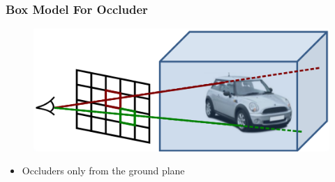 \documentclass[xcolor=dvipsnames]{beamer}
\begin{document}
\begin{frame}
	\frametitle{Box Model For Occluder}
	
	\begin{figure}
		\includegraphics[width=\textwidth]{img/occ_state.png}
	\end{figure}
	
	\begin{itemize}
		\item Occluders only from the ground plane
	\end{itemize}
	
\end{frame}
\end{document}
